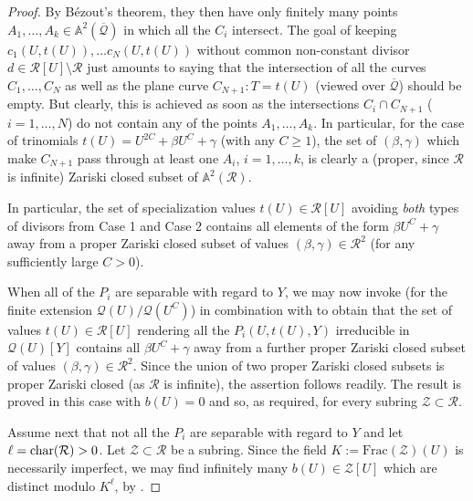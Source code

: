 \documentclass[11pt,a4paper,reqno]{amsart}
\theoremstyle{definition}
\begin{document}
\begin{proof}
By B\'ezout's theorem, they then have only finitely many points  $A_1,\dots, A_k\in \mathbb{A}^2(\overline{\mathcal Q})$ in which all the $C_i$ intersect.
The goal of keeping $c_1(U,t(U)),\dots c_N(U,t(U))$ without common non-constant divisor $d\in \mathcal R[U]\setminus \mathcal R$ just amounts to saying that the intersection of all the curves $C_1,\dots, C_N$ as well as the plane curve $C_{N+1}:T=t(U)$ (viewed over $\overline{\mathcal Q}$) should be empty. 
But clearly, this is achieved as soon as the intersections $C_i\cap C_{N+1}$ ($i=1,\dots, N$) do not contain any of the points $A_1,\dots,A_k$.
In particular, for the case of trinomials $t(U) = U^{2C}+\beta U^C + \gamma$ (with any $C\ge 1$), the set of $(\beta,\gamma)$ which make $C_{N+1}$ pass through at least one $A_i$, $i=1,\dots, k$, is clearly a (proper, since $\mathcal R$ is infinite) Zariski closed subset of $\mathbb{A}^2(\mathcal R)$.

In particular, the set of specialization values $t(U)\in \mathcal R[U]$ avoiding {\it both} types of divisors from Case 1 and Case 2 contains all elements of the form $\beta U^C +\gamma$ away from a proper Zariski closed subset of values $(\beta,\gamma)\in \mathcal R^2$ (for any sufficiently large $C>0$). 

When all of the $P_i$ are separable with regard to $Y$, we may now invoke \cite[Proposition 13.3.3]{FJ23} (for the finite extension $\mathcal Q(U)/\mathcal Q(U^C)$) in combination with \cite[Proposition 14.2.1]{FJ23} to obtain that the set of values $t(U)\in \mathcal R[U]$ rendering all the $P_i(U,t(U), Y)$ irreducible in $\mathcal Q(U)[Y]$ contains all $\beta U^C +\gamma$ away from a further proper Zariski closed subset of values $(\beta,\gamma)\in \mathcal R^2$. Since the union of two proper Zariski closed subsets is proper Zariski closed (as $\mathcal R$ is infinite), the assertion follows readily. The result is proved in this case with $b(U)=0$ and so,
as required, for every subring ${\mathcal Z}\subset {\mathcal R}$.

 Assume next that not all the $P_i$ are separable with regard to $Y$ and let $\ell={\rm char}(\mathcal R)>0$. Let $\mathcal Z\subset \mathcal R$ be a subring. Since the field $K:=\textrm{Frac}(\mathcal Z)(U)$ is necessarily imperfect, we may find infinitely many $b(U)\in \mathcal Z[U]$ which are distinct modulo $K^\ell$, by \cite[Lemma 4.4]{BDN20b}. 


\end{proof}
\end{document}
